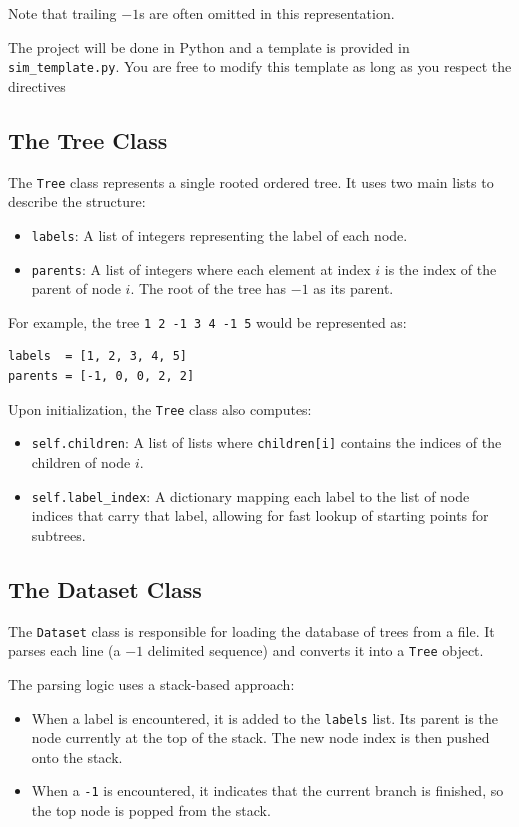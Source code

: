 \documentclass[]{article}
\begin{document}
Note that trailing $-1$s are often omitted in this representation.

The project will be done in Python and a template is provided in \texttt{sim\_template.py}. You are free to modify this template as long as you respect the directives


\subsection{The Tree Class}

The \texttt{Tree} class represents a single rooted ordered tree. It uses two main lists to describe the structure:
\begin{itemize}
    \item \texttt{labels}: A list of integers representing the label of each node.
    \item \texttt{parents}: A list of integers where each element at index $i$ is the index of the parent of node $i$. The root of the tree has $-1$ as its parent.
\end{itemize}

For example, the tree \texttt{1 2 -1 3 4 -1 5} would be represented as:
\begin{lstlisting}
labels  = [1, 2, 3, 4, 5]
parents = [-1, 0, 0, 2, 2]
\end{lstlisting}

Upon initialization, the \texttt{Tree} class also computes:
\begin{itemize}
    \item \texttt{self.children}: A list of lists where \texttt{children[i]} contains the indices of the children of node $i$.
    \item \texttt{self.label\_index}: A dictionary mapping each label to the list of node indices that carry that label, allowing for fast lookup of starting points for subtrees.
\end{itemize}

\subsection{The Dataset Class}

The \texttt{Dataset} class is responsible for loading the database of trees from a file. It parses each line (a $-1$ delimited sequence) and converts it into a \texttt{Tree} object.

The parsing logic uses a stack-based approach:
\begin{itemize}
    \item When a label is encountered, it is added to the \texttt{labels} list. Its parent is the node currently at the top of the stack. The new node index is then pushed onto the stack.
    \item When a \texttt{-1} is encountered, it indicates that the current branch is finished, so the top node is popped from the stack.
\end{itemize}
\end{document}
